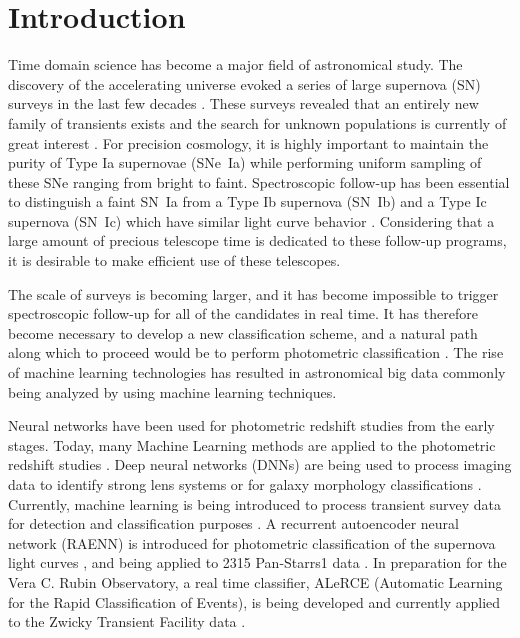 \documentclass[useamsfonts]{pasj01}
\begin{document}
\section{Introduction}
Time domain science has become a major field of astronomical study. The discovery of the accelerating universe \citep{perlmutter99a,riess98a} evoked a series of large supernova (SN) surveys in the last few decades 
\citep{betoule14a,scolnic18a,brout19a}.    
These surveys revealed that an entirely new family of transients exists and the search for unknown populations is currently of great interest \citep{howell06a,phillips07a,quimby07b}.
For precision cosmology, it is highly important to maintain the purity of Type Ia supernovae (SNe~Ia) while performing uniform sampling of these SNe ranging from bright to faint. 
Spectroscopic follow-up has been essential to distinguish a faint SN~Ia from a Type Ib supernova (SN~Ib) and a Type Ic supernova (SN~Ic) which have similar light curve behavior \citep{scolnic14a}. 
Considering that a large amount of precious telescope time is dedicated to these follow-up programs, it is desirable to make efficient use of these telescopes.

The scale of surveys is becoming larger, and it has become impossible to trigger spectroscopic follow-up for all of the candidates in real time. It has therefore become necessary to develop a new classification scheme, and a natural path along which to proceed would be to perform photometric classification \citep{sako11a,jonesl8a}. The rise of machine learning technologies has resulted in astronomical big data commonly being analyzed by using machine learning techniques.

Neural networks have been used for photometric redshift studies from the early stages. 
Today, many Machine Learning methods are applied to the photometric redshift studies \citep{collister04a,carliles10a,pasquet19a}.
Deep neural networks (DNNs) are being used to process imaging data to identify strong lens systems \citep{petrillo17a} or for galaxy morphology classifications \citep{hausen19a}. 
Currently, machine learning is being introduced to process transient survey data for detection \citep{goldstein15a} and classification purposes \citep{charnock17a}.
A recurrent autoencoder neural network (RAENN) is introduced for photometric classification of the supernova light curves \citep{villar20a}, and being applied to 2315 Pan-Starrs1 data \citep{hosseinzadeh20a}.  
In preparation for the Vera C. Rubin Observatory, a real time classifier, ALeRCE (Automatic Learning for the Rapid Classification of Events), is being developed \citep{sanchez-saez20a,forster20a} and currently applied to the Zwicky Transient Facility data \citep{carrasco-davis20a}.
\end{document}
